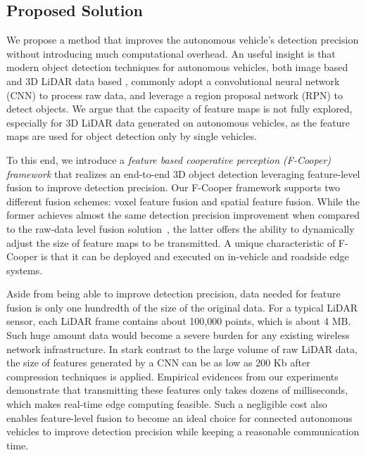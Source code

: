 \documentclass[sigconf]{acmart}
\begin{document}
  

\subsection{Proposed Solution}
We propose a method that improves the autonomous vehicle's detection precision without introducing much computational overhead.
An useful insight is that modern object detection techniques for autonomous vehicles, both image based \cite{ren2015faster,liu2016ssd} and 3D LiDAR data based \cite{yan2018second,qi2018frustum}, commonly adopt a convolutional neural network (CNN) \cite{simonyan2014very,he2016deep} to process raw data, and leverage a region proposal network (RPN) \cite{ren2015faster} to detect objects. 
We argue that the capacity of feature maps is not fully explored, especially for 3D LiDAR data generated on autonomous vehicles, as the feature maps are used for object detection only by single vehicles.

To this end, we introduce a {\em feature based cooperative perception (F-Cooper) framework} that realizes an end-to-end 3D object detection leveraging feature-level fusion to improve
detection precision. 
Our F-Cooper framework supports two different fusion schemes: voxel feature fusion and spatial feature fusion.
While the former achieves almost the same detection precision improvement when compared to the raw-data level fusion solution~\cite{qi2019cooper}, the latter offers the ability to dynamically adjust the size of feature maps to be transmitted.
A unique characteristic of F-Cooper is that it can be deployed and executed on in-vehicle and roadside edge systems.


Aside from being able to improve detection precision, data needed for feature fusion is only one hundredth of the size of the original data.
For a typical LiDAR sensor, each LiDAR frame contains about 100,000 points, which is about 4 MB. Such huge amount data would become a severe burden for any existing wireless network infrastructure. In stark contrast to the large volume of raw LiDAR data, the size of features generated by a CNN can be as low as 200 Kb after compression techniques is applied. 
Empirical evidences from our experiments demonstrate that transmitting these features only takes dozens of milliseconds, which makes real-time edge computing feasible. Such a negligible cost also enables feature-level fusion to become an ideal choice for connected autonomous vehicles to improve detection precision while keeping a reasonable communication time.
\end{document}
